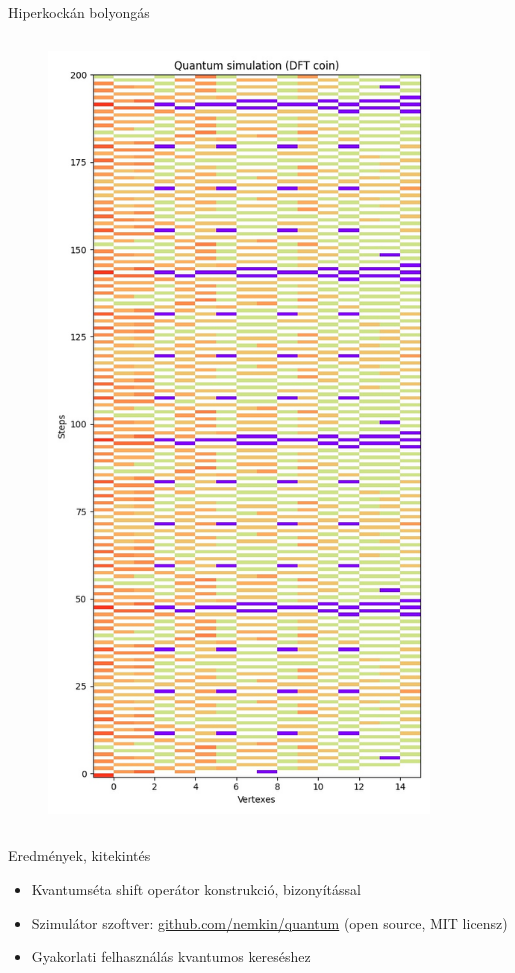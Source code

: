 \documentclass[aspectratio=169]{beamer}
\begin{document}
\begin{frame}{Hiperkockán bolyongás}
\begin{columns}[onlytextwidth]
\begin{column}{.23\textwidth}
\begin{figure}
        \includegraphics[width=0.9\textwidth]{./tdk_figures/results/hypercube/dft.jpg}
      \end{figure}
    \end{column}
  \end{columns}
\end{frame}

\begin{frame}{Eredmények, kitekintés}
\begin{itemize}
    \item Kvantumséta shift operátor konstrukció, bizonyítással
    \item Szimulátor szoftver: \url{github.com/nemkin/quantum} (open source, MIT licensz)
    \item Gyakorlati felhasználás kvantumos kereséshez
\end{itemize}
\end{frame}
\end{document}

